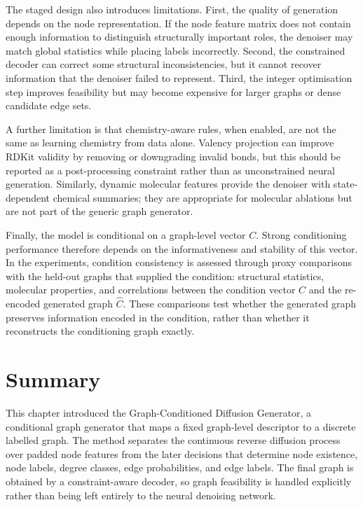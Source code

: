 The staged design also introduces limitations. First, the quality of generation
depends on the node representation. If the node feature matrix does not contain enough
information to distinguish structurally important roles, the denoiser may match
global statistics while placing labels incorrectly. Second, the constrained
decoder can correct some structural inconsistencies, but it cannot recover
information that the denoiser failed to represent. Third, the integer
optimisation step improves feasibility but may become expensive for larger
graphs or dense candidate edge sets.

A further limitation is that chemistry-aware rules, when enabled, are not the
same as learning chemistry from data alone. Valency projection can improve
RDKit validity by removing or downgrading invalid bonds, but this should be
reported as a post-processing constraint rather than as unconstrained neural
generation. Similarly, dynamic molecular features provide the denoiser with
state-dependent chemical summaries; they are appropriate for molecular
ablations but are not part of the generic graph generator.

Finally, the model is conditional on a graph-level vector \(C\). Strong
conditioning performance therefore depends on the informativeness and stability
of this vector. In the experiments, condition consistency is assessed through
proxy comparisons with the held-out graphs that supplied the condition:
structural statistics, molecular properties, and correlations between the
condition vector \(C\) and the re-encoded generated graph \(\hat{C}\). These
comparisons test whether the generated graph preserves information encoded in
the condition, rather than whether it reconstructs the conditioning graph
exactly.

\section{Summary}
\label{sec:generator:summary}

This chapter introduced the Graph-Conditioned Diffusion Generator, a
conditional graph generator that maps a fixed graph-level descriptor to a
discrete labelled graph. The method separates the continuous reverse diffusion
process over padded node features from the later decisions that determine node
existence, node labels, degree classes, edge probabilities, and edge labels.
The final graph is obtained by a constraint-aware decoder, so graph feasibility
is handled explicitly rather than being left entirely to the neural denoising
network.

